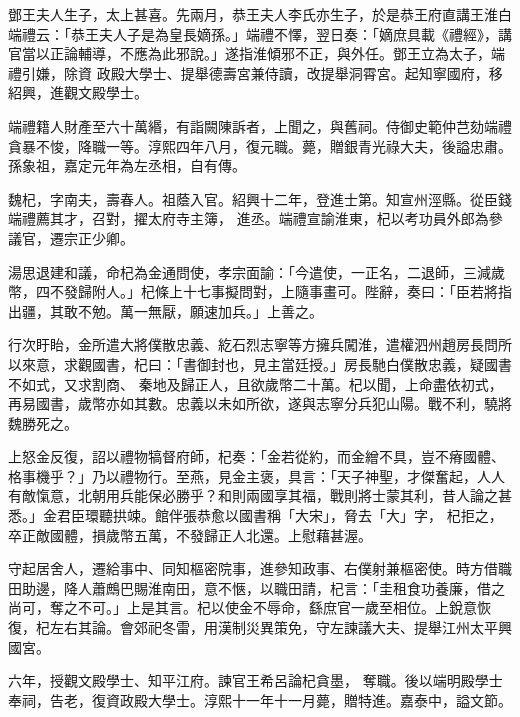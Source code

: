 \begin{pinyinscope}
 鄧王夫人生子，太上甚喜。先兩月，恭王夫人李氏亦生子，於是恭王府直講王淮白端禮云：「恭王夫人子是為皇長嫡孫。」端禮不懌，翌日奏：「嫡庶具載《禮經》，講官當以正論輔導，不應為此邪說。」遂指淮傾邪不正，與外任。鄧王立為太子，端禮引嫌，除資
 政殿大學士、提舉德壽宮兼侍讀，改提舉洞霄宮。起知寧國府，移紹興，進觀文殿學士。



 端禮籍人財產至六十萬緡，有詣闕陳訴者，上聞之，與舊祠。侍御史範仲芑劾端禮貪暴不悛，降職一等。淳熙四年八月，復元職。薨，贈銀青光祿大夫，後謚忠肅。孫象祖，嘉定元年為左丞相，自有傳。



 魏杞，字南夫，壽春人。祖蔭入官。紹興十二年，登進士第。知宣州涇縣。從臣錢端禮薦其才，召對，擢太府寺主簿，
 進丞。端禮宣諭淮東，杞以考功員外郎為參議官，遷宗正少卿。



 湯思退建和議，命杞為金通問使，孝宗面諭：「今遣使，一正名，二退師，三減歲幣，四不發歸附人。」杞條上十七事擬問對，上隨事畫可。陛辭，奏曰：「臣若將指出疆，其敢不勉。萬一無厭，願速加兵。」上善之。



 行次盱眙，金所遣大將僕散忠義、紇石烈志寧等方擁兵闖淮，遣權泗州趙房長問所以來意，求觀國書，杞曰：「書御封也，見主當廷授。」房長馳白僕散忠義，疑國書不如式，又求割商、
 秦地及歸正人，且欲歲幣二十萬。杞以聞，上命盡依初式，再易國書，歲幣亦如其數。忠義以未如所欲，遂與志寧分兵犯山陽。戰不利，驍將魏勝死之。



 上怒金反復，詔以禮物犒督府師，杞奏：「金若從約，而金繒不具，豈不瘠國體、格事機乎？」乃以禮物行。至燕，見金主褒，具言：「天子神聖，才傑奮起，人人有敵愾意，北朝用兵能保必勝乎？和則兩國享其福，戰則將士蒙其利，昔人論之甚悉。」金君臣環聽拱竦。館伴張恭愈以國書稱「大宋」，脅去「大」字，
 杞拒之，卒正敵國體，損歲幣五萬，不發歸正人北還。上慰藉甚渥。



 守起居舍人，遷給事中、同知樞密院事，進參知政事、右僕射兼樞密使。時方借職田助邊，降人蕭鷓巴賜淮南田，意不愜，以職田請，杞言：「圭租食功養廉，借之尚可，奪之不可。」上是其言。杞以使金不辱命，繇庶官一歲至相位。上銳意恢復，杞左右其論。會郊祀冬雷，用漢制災異策免，守左諫議大夫、提舉江州太平興國宮。



 六年，授觀文殿學士、知平江府。諫官王希呂論杞貪墨，
 奪職。後以端明殿學士奉祠，告老，復資政殿大學士。淳熙十一年十一月薨，贈特進。嘉泰中，謚文節。




\end{pinyinscope}

